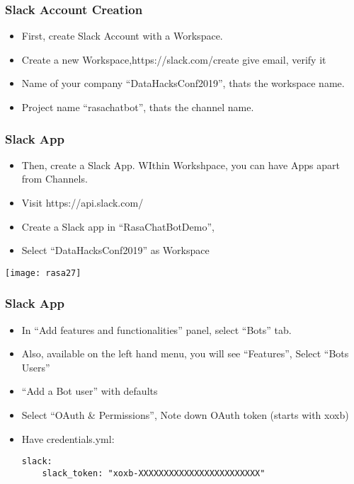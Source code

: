 \begin{frame}[fragile]\frametitle{Slack Account Creation}
\begin{itemize}
\item First, create Slack Account with a Workspace.
\item Create a new Workspace,https://slack.com/create give email, verify it
\item Name of your company ``DataHacksConf2019'', thats the workspace name.
\item Project name ``rasachatbot'', thats the channel name.
\end{itemize}

\end{frame}

\begin{frame}[fragile]\frametitle{Slack App}
\begin{itemize}
\item Then, create a Slack App. WIthin Workshpace, you can have Apps apart from Channels.
\item Visit https://api.slack.com/
\item Create a Slack app in ``RasaChatBotDemo'', 
\item Select ``DataHacksConf2019'' as Workspace
\end{itemize}

\begin{center}
\texttt{[image: rasa27]}
\end{center}
\end{frame}

\begin{frame}[fragile]\frametitle{Slack App}
\begin{itemize}
\item In ``Add features and functionalities'' panel, select ``Bots'' tab.
\item Also, available on the left hand menu, you will see ``Features'', Select ``Bots Users''
\item ``Add a Bot user'' with defaults
\item Select ``OAuth \& Permissions'', Note down OAuth token (starts with xoxb)
\item Have credentials.yml: 
\begin{lstlisting}
slack:
	slack_token: "xoxb-XXXXXXXXXXXXXXXXXXXXXXXX"
\end{lstlisting}
\end{itemize}


\end{frame}

